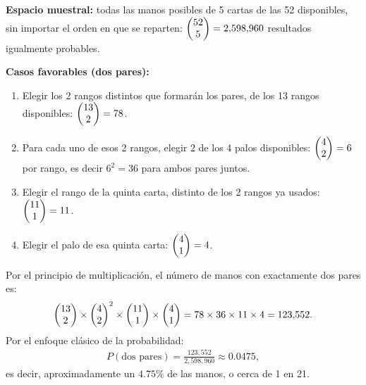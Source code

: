 \begin{solproblema}[prob:b53268b]
	\textbf{Espacio muestral:} todas las manos posibles de 5 cartas de las 52 disponibles, sin importar el orden en que se reparten: $\begin{pmatrix} 52 \\ 5\end{pmatrix} = 2{,}598{,}960$ resultados igualmente probables.

	\textbf{Casos favorables (dos pares):}
	\begin{enumerate}
		\item Elegir los 2 rangos distintos que formarán los pares, de los 13 rangos disponibles: $\begin{pmatrix} 13 \\ 2\end{pmatrix} = 78$.
		\item Para cada uno de esos 2 rangos, elegir 2 de los 4 palos disponibles: $\begin{pmatrix} 4 \\ 2\end{pmatrix} = 6$ por rango, es decir $6^2 = 36$ para ambos pares juntos.
		\item Elegir el rango de la quinta carta, distinto de los 2 rangos ya usados: $\begin{pmatrix} 11 \\ 1\end{pmatrix} = 11$.
		\item Elegir el palo de esa quinta carta: $\begin{pmatrix} 4 \\ 1\end{pmatrix} = 4$.
	\end{enumerate}
	Por el principio de multiplicación, el número de manos con exactamente dos pares es:
	\begin{align}
		\begin{pmatrix} 13 \\ 2\end{pmatrix} \times \begin{pmatrix} 4 \\ 2\end{pmatrix}^2 \times \begin{pmatrix} 11 \\ 1\end{pmatrix} \times \begin{pmatrix} 4 \\ 1\end{pmatrix} = 78 \times 36 \times 11 \times 4 = 123{,}552.
	\end{align}
	Por el enfoque clásico de la probabilidad:
	\begin{align}
		P(\text{dos pares}) = \frac{123{,}552}{2{,}598{,}960} \approx 0.0475,
	\end{align}
	es decir, aproximadamente un $4.75\%$ de las manos, o cerca de 1 en 21.
\end{solproblema}
